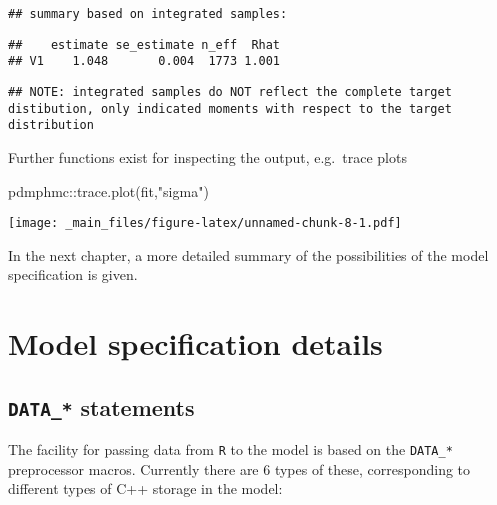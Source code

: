 \documentclass[
]{book}
\newenvironment{Shaded}{\begin{snugshade}}{\end{snugshade}}
\newcommand{\FunctionTok}[1]{\textcolor[rgb]{0.00,0.00,0.00}{#1}}
\newcommand{\NormalTok}[1]{#1}
\newcommand{\SpecialCharTok}[1]{\textcolor[rgb]{0.00,0.00,0.00}{#1}}
\newcommand{\StringTok}[1]{\textcolor[rgb]{0.31,0.60,0.02}{#1}}
\begin{document}
\begin{verbatim}
## summary based on integrated samples:
\end{verbatim}

\begin{verbatim}
##    estimate se_estimate n_eff  Rhat
## V1    1.048       0.004  1773 1.001
\end{verbatim}

\begin{verbatim}
## NOTE: integrated samples do NOT reflect the complete target distibution, only indicated moments with respect to the target distribution
\end{verbatim}

Further functions exist for inspecting the output, e.g.~trace plots

\begin{Shaded}
\begin{Highlighting}[]
\NormalTok{pdmphmc}\SpecialCharTok{::}\FunctionTok{trace.plot}\NormalTok{(fit,}\StringTok{"sigma"}\NormalTok{)}
\end{Highlighting}
\end{Shaded}

\texttt{[image: \_main\_files/figure-latex/unnamed-chunk-8-1.pdf]}

In the next chapter, a more detailed summary of the possibilities of the model specification is given.

\hypertarget{model-specification-details}{%
\chapter{Model specification details}\label{model-specification-details}}

\hypertarget{data_-statements}{%
\section{\texorpdfstring{\texttt{DATA\_*} statements}{DATA\_* statements}}\label{data_-statements}}

The facility for passing data from \texttt{R} to the model is based on the \texttt{DATA\_*} preprocessor macros. Currently there are 6 types of these, corresponding to different types of C++ storage in the model:
\end{document}
